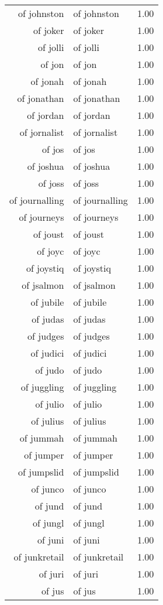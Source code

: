 \begin{table}[ht]
\begin{tabular}{rlr}
  of johnston & of johnston & 1.00 \\ 
  of joker & of joker & 1.00 \\ 
  of jolli & of jolli & 1.00 \\ 
  of jon & of jon & 1.00 \\ 
  of jonah & of jonah & 1.00 \\ 
  of jonathan & of jonathan & 1.00 \\ 
  of jordan & of jordan & 1.00 \\ 
  of jornalist & of jornalist & 1.00 \\ 
  of jos & of jos & 1.00 \\ 
  of joshua & of joshua & 1.00 \\ 
  of joss & of joss & 1.00 \\ 
  of journalling & of journalling & 1.00 \\ 
  of journeys & of journeys & 1.00 \\ 
  of joust & of joust & 1.00 \\ 
  of joyc & of joyc & 1.00 \\ 
  of joystiq & of joystiq & 1.00 \\ 
  of jsalmon & of jsalmon & 1.00 \\ 
  of jubile & of jubile & 1.00 \\ 
  of judas & of judas & 1.00 \\ 
  of judges & of judges & 1.00 \\ 
  of judici & of judici & 1.00 \\ 
  of judo & of judo & 1.00 \\ 
  of juggling & of juggling & 1.00 \\ 
  of julio & of julio & 1.00 \\ 
  of julius & of julius & 1.00 \\ 
  of jummah & of jummah & 1.00 \\ 
  of jumper & of jumper & 1.00 \\ 
  of jumpslid & of jumpslid & 1.00 \\ 
  of junco & of junco & 1.00 \\ 
  of jund & of jund & 1.00 \\ 
  of jungl & of jungl & 1.00 \\ 
  of juni & of juni & 1.00 \\ 
  of junkretail & of junkretail & 1.00 \\ 
  of juri & of juri & 1.00 \\ 
  of jus & of jus & 1.00 \\ 

\end{tabular}
\end{table}
